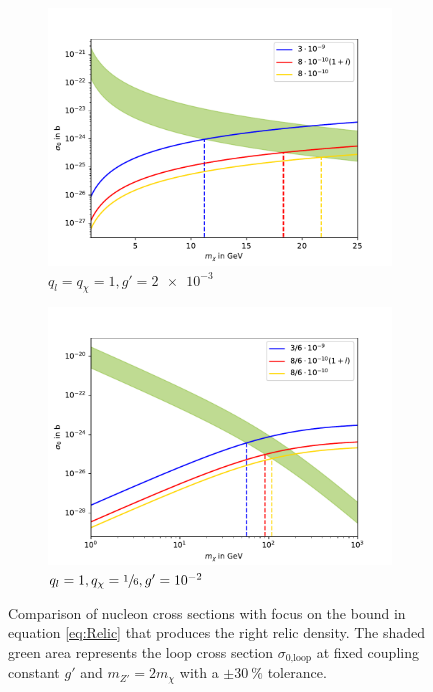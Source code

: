 \begin{figure}
	\centering
	\begin{subfigure}[]{0.8\textwidth}
		\includegraphics[width=\textwidth]{content/graphics/Relic11.pdf}
		\caption{$q_l=q_\chi=1,g'=\SI{2e-3}{}$}
		\label{fig:Relic11}
	\end{subfigure}
	\begin{subfigure}[]{0.8\textwidth}
		\includegraphics[width=\textwidth]{content/graphics/Relic116.pdf}
		\caption{$q_l=1,q_\chi=\sfrac{1}{6},g'=\SI{e-2}{}$}
		\label{fig:Relic116}
	\end{subfigure}
	\caption{Comparison of nucleon cross sections with focus on the bound in equation \eqref{eq:Relic} that produces the right relic density. The shaded green area represents the loop cross section $\sigma_\text{0,loop}$ at fixed coupling constant $g'$ and $m_{Z'} = 2m_\chi$ with a $\pm\SI{30}{\%}$ tolerance.}
	\label{fig:Relic}
\end{figure}

